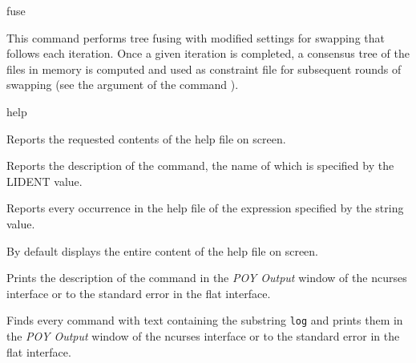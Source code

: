 \begin{command}{fuse}{}
\begin{poyexamples}
            {This command performs tree fusing  
            with modified settings for swapping that follows each iteration. Once
            a given iteration is completed, a consensus tree of the files in memory
            is computed and used as constraint file for subsequent rounds of swapping (see
            the argument  of the command
            ).}

     \end{poyexamples}
        
        \begin{poyalso}
    \end{poyalso}

\end{command}

\begin{command}{help}{}

	
	\begin{poydescription}
         Reports the requested contents of the help file on screen.
	\end{poydescription}
	
	\begin{arguments}
            {Reports the description of the command, the name of which is specified by the
            LIDENT value.}
            {}

            {Reports every occurrence in the help file of the expression specified by the string value.}
            {}
	\end{arguments}
	
	\poydefaults{}
        {By default \poy displays the entire content of the help file on screen.}
        
	\begin{poyexamples}
            {Prints the description of the command
             in the \emph{POY Output} window of the ncurses
            interface or to the standard error in the flat interface.}

            {Finds every command with text containing the substring \texttt{log} and
            prints them in the \emph{POY Output} window of the ncurses
            interface or to the standard error in the flat interface.}

	\end{poyexamples}

\end{command}


